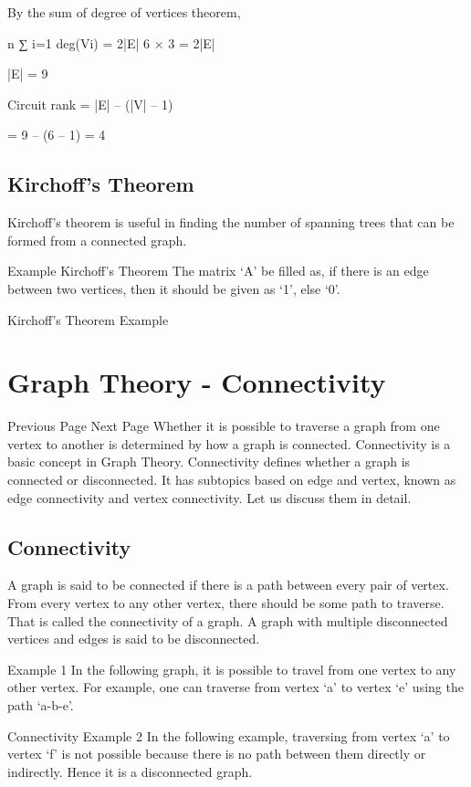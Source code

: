 By the sum of degree of vertices theorem,

n
∑
i=1
 deg(Vi) = 2|E|
6 × 3 = 2|E|

|E| = 9

Circuit rank = |E| – (|V| – 1)

= 9 – (6 – 1) = 4

\subsection{Kirchoff’s Theorem}
Kirchoff’s theorem is useful in finding the number of spanning trees that can be formed from a connected graph.

Example
Kirchoff’s Theorem
The matrix ‘A’ be filled as, if there is an edge between two vertices, then it should be given as ‘1’, else ‘0’.

Kirchoff’s Theorem Example


\newpage


\section{Graph Theory - Connectivity}

 
 Previous Page Next Page  
Whether it is possible to traverse a graph from one vertex to another is determined by how a graph is connected. Connectivity is a basic concept in Graph Theory. Connectivity defines whether a graph is connected or disconnected. It has subtopics based on edge and vertex, known as edge connectivity and vertex connectivity. Let us discuss them in detail.

\subsection{Connectivity}
A graph is said to be connected if there is a path between every pair of vertex. From every vertex to any other vertex, there should be some path to traverse. That is called the connectivity of a graph. A graph with multiple disconnected vertices and edges is said to be disconnected.

Example 1
In the following graph, it is possible to travel from one vertex to any other vertex. For example, one can traverse from vertex ‘a’ to vertex ‘e’ using the path ‘a-b-e’.

Connectivity
Example 2
In the following example, traversing from vertex ‘a’ to vertex ‘f’ is not possible because there is no path between them directly or indirectly. Hence it is a disconnected graph.

